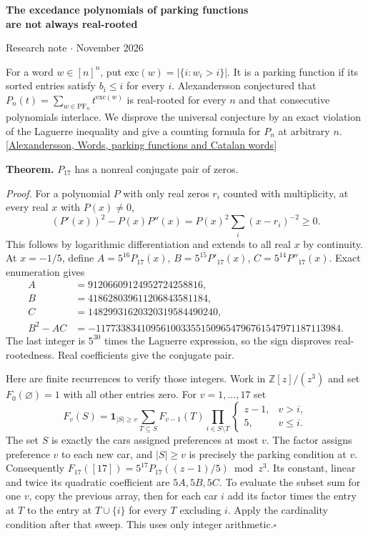 \documentclass[11pt]{article}
\newcommand{\done}{\hfill\(\square\)}
\begin{document}
\begin{center}{\Large\bfseries The excedance polynomials of parking functions\\ are not always real-rooted}\par
\small Research note \enspace$\cdot$ November 2026\end{center}

For a word $w\in[n]^n$, put $\mathrm{exc}(w)=|\{i:w_i>i\}|$. It is a parking function if its sorted entries satisfy $b_i\le i$ for every $i$. Alexandersson conjectured that $P_n(t)=\sum_{w\in\mathrm{PF}_n}t^{\mathrm{exc}(w)}$ is real-rooted for every $n$ and that consecutive polynomials interlace. We disprove the universal conjecture by an exact violation of the Laguerre inequality and give a counting formula for $P_n$ at arbitrary $n$. [\href{https://www.symmetricfunctions.com/realRootedOpenProblems.htm}{Alexandersson, Words, parking functions and Catalan words}]

\textbf{Theorem.} $P_{17}$ has a nonreal conjugate pair of zeros.

\textit{Proof.} For a polynomial $P$ with only real zeros $r_i$ counted with multiplicity, at every real $x$ with $P(x)\ne0$,
\[
    (P'(x))^2-P(x)P''(x)=P(x)^2\sum_i(x-r_i)^{-2}\ge0 .
\]
This follows by logarithmic differentiation and extends to all real $x$ by continuity. At $x=-1/5$, define $A=5^{16}P_{17}(x)$, $B=5^{15}P'_{17}(x)$, $C=5^{14}P''_{17}(x)$. Exact enumeration gives
\[
\begin{aligned}
 A&=91206609124952724258816,\\
 B&=418628039611206843581184,\\
 C&=14829931620320319584490240,\\
 B^2-AC&=-1177338341095610033551509654796761547971187113984 .
\end{aligned}
\]
The last integer is $5^{30}$ times the Laguerre expression, so the sign disproves real-rootedness. Real coefficients give the conjugate pair.

Here are finite recurrences to verify those integers. Work in $\mathbb{Z}[z]/(z^3)$ and set $F_0(\varnothing)=1$ with all other entries zero. For $v=1,\ldots,17$ set
\[
 F_v(S)=\mathbf1_{|S|\ge v}
       \sum_{T\subseteq S} F_{v-1}(T)
       \prod_{i\in S\setminus T}
         \begin{cases}z-1,&v>i,\\5,&v\le i.\end{cases}
 \tag{1}
\]
The set $S$ is exactly the cars assigned preferences at most $v$. The factor assigns preference $v$ to each new car, and $|S|\ge v$ is precisely the parking condition at $v$. Consequently $F_{17}([17])=5^{17}P_{17}((z-1)/5)\bmod z^3$. Its constant, linear and twice its quadratic coefficient are $5A,5B,5C$. To evaluate the subset sum for one $v$, copy the previous array, then for each car $i$ add its factor times the entry at $T$ to the entry at $T\cup\{i\}$ for every $T$ excluding $i$. Apply the cardinality condition after that sweep. This uses only integer arithmetic.\done
\end{document}
